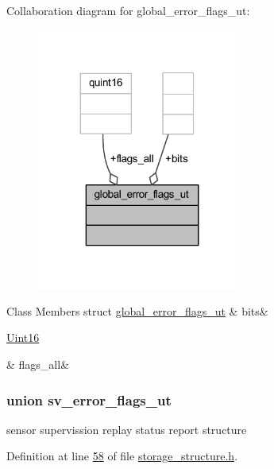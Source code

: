 Collaboration diagram for global\+\_\+error\+\_\+flags\+\_\+ut\+:
\nopagebreak
\begin{figure}[H]
\begin{center}
\leavevmode
\includegraphics[width=191pt]{d3/dd5/a00215}
\end{center}
\end{figure}
\begin{DoxyFields}{Class Members}
\hypertarget{a00003_acc32d0584c7a008086c95be78659191d}{struct \hyperlink{a00003_d1/d09/a00077}{global\+\_\+error\+\_\+flags\+\_\+ut}}\label{a00003_acc32d0584c7a008086c95be78659191d}
&
bits&
\\
\hline

\hypertarget{a00003_ab5bcfbc3ba785f199fd15527b12699f5}{\hyperlink{a00001_aae7407b021d43f7193a81a58cfb3e297}{Uint16}}\label{a00003_ab5bcfbc3ba785f199fd15527b12699f5}
&
flags\+\_\+all&
\\
\hline

\end{DoxyFields}
\label{d2/df5/a00137}
\hypertarget{a00003_d2/df5/a00137}{}
\subsubsection{union sv\+\_\+error\+\_\+flags\+\_\+ut}
sensor supervission replay status report structure 

Definition at line \hyperlink{a00003_source_l00058}{58} of file \hyperlink{a00003_source}{storage\+\_\+structure.\+h}.



